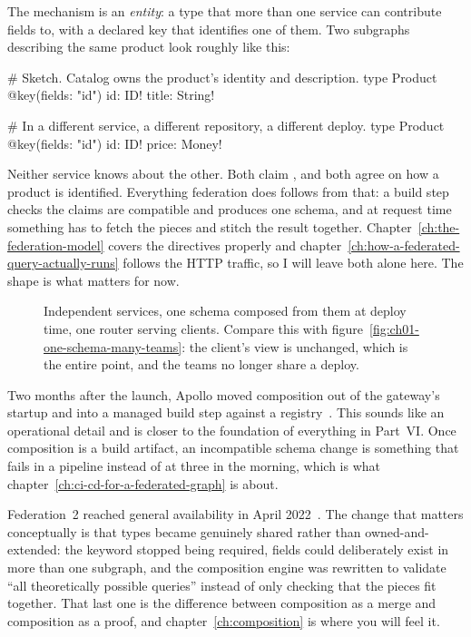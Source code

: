 %
The mechanism is an \emph{entity}: a type that more than one service can
contribute fields to, with a declared key that identifies one of them. Two
subgraphs describing the same product look roughly like this:

\begin{graphqlsdl}
# Sketch. Catalog owns the product's identity and description.
type Product @key(fields: "id") {
  id: ID!
  title: String!
}

# In a different service, a different repository, a different deploy.
type Product @key(fields: "id") {
  id: ID!
  price: Money!
}
\end{graphqlsdl}

Neither service knows about the other. Both claim , and both agree
on how a product is identified. Everything federation does follows from that:
a build step checks the claims are compatible and produces one schema, and at
request time something has to fetch the pieces and stitch the result together.
Chapter~\ref{ch:the-federation-model} covers the directives properly and
chapter~\ref{ch:how-a-federated-query-actually-runs} follows the HTTP traffic,
so I will leave both alone here. The shape is what matters for now.

\begin{figure}[htbp]
  \centering
  
  \caption{Independent services, one schema composed from them at deploy time,
  one router serving clients. Compare this with
  figure~\ref{fig:ch01-one-schema-many-teams}: the client's view is unchanged,
  which is the entire point, and the teams no longer share a deploy.}
  \label{fig:ch01-supergraph-shape}
\end{figure}

Two months after the launch, Apollo moved composition out of the gateway's
startup and into a managed build step against a
registry~\autocite{debergalis2019managed}. This sounds like an operational
detail and is closer to the foundation of everything in Part~VI. Once
composition is a build artifact, an incompatible schema change is something
that fails in a pipeline instead of at three in the morning, which is what
chapter~\ref{ch:ci-cd-for-a-federated-graph} is about.

Federation~2 reached general availability in April
2022~\autocite{prasek2022federation2}. The change that matters conceptually is
that types became genuinely shared rather than owned-and-extended: the
 keyword stopped being required, fields could deliberately exist
in more than one subgraph, and the composition engine was rewritten to validate
\enquote{all theoretically possible queries} instead of only checking that the
pieces fit together. That last one is the difference between composition as a
merge and composition as a proof, and chapter~\ref{ch:composition} is where you
will feel it.

